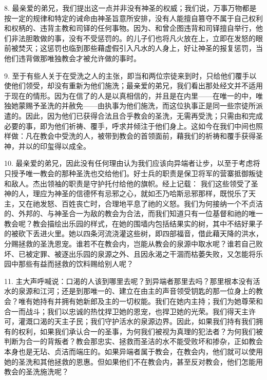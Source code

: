 8. 最亲爱的弟兄，我们提出这一点并非没有神圣的权威；我们说，万事万物都是按一定的规律和特定的诫命由神圣旨意所安排，没有人能擅自篡夺不属于自己权利和权柄的、违背主教和司铎的任何事物。因为、和曾企图违背和司铎擅自举行，他们非法胆敢做的事，没有不受惩罚的。的儿子们也将凡火放在上，立即在发怒的眼前被焚灭；这惩罚也临到那些藉虚假引入凡水的人身上，好让神圣的报复惩罚，当他们违背做那唯独教会才被允许做的事时。\par

9. 至于有些人关于在受洗之人的主张，即当和两位宗徒来到时，只给他们覆手以使他们领受，却没有重新为他们施洗；最亲爱的弟兄，我们看出那处经文并不适用于现在的情形。因为在信了的人是以真相信的，并且是在内里——在唯一的中，唯独她蒙赐予圣洗的并赦免——由执事为他们施洗，而这位执事正是同一些宗徒所派遣的。因此，因为他们已获得合法且合乎教会的圣洗，无需再受洗；只需由和完成必要的事，即为他们祈祷、覆手，呼求并倾注于他们身上。这如今在我们中间也照样做：凡在教会中受洗的人，被带到教会的首领面前，藉我们的祈祷和覆手获得圣神，并以的印玺得以成全。\par

10. 最亲爱的弟兄，因此没有任何理由认为我们应该向异端者让步，以至于考虑将只授予唯一教会的那种圣洗也交给他们。好士兵的职责是保卫将军的营寨抵御叛徒和敌人。杰出领袖的职责是守护托付给他的旗帜。经上记载： 我们这些领受了圣神的人，理应为神圣的信德怀有忌邪之心，就如丕乃哈斯忌邪那样，既悦乐了天主，又在祂发怒、百姓丧亡时，合理地平息了祂的义怒。我们为何接纳一个不贞洁的、外邦的、与神圣合一为敌的教会为合法，而我们知道只有一位基督和祂的唯一教会呢？教会描绘出乐园的样式，在她的围墙内包括结果实的树，其中不结好果子的被砍下丢进火里。她以四条河流浇灌这些树，即四部福音，借此藉天降的洪水，分赐拯救的圣洗恩宠。谁若不在教会内，岂能从教会的泉源中取水呢？谁若自己败坏、已被定罪、被逐出乐园的泉源之外、且因永渴之干涸而枯萎失败，又怎能将乐园中那些有益而拯救的饮料赐给别人呢？\par

11. 主大声呼喊说：口渴的人该到哪里去呢？到异端者那里去吗？那里根本没有活水的泉源和江河；还是到那唯一的、建立在由主的声音领受钥匙的那一位身上的教会？唯有她持有并拥有她新郎及主的一切权能。我们在她内主持；我们为她尊荣和合一而战斗；我们以忠诚的热忱捍卫她的恩宠，也捍卫她的光荣。我们得天主许可，灌溉口渴的天主子民；我们守护活水的泉源边界。因此，如果我们持有我们拥有的权利，如果我们承认合一的圣事，为何我们被视为真理的犯法者？为何我们被判断为合一的背叛者？教会那忠实、拯救而圣洁的水不能受败坏和掺杂，正如教会本身也是无玷、贞洁而端庄的。如果异端者属于教会，在教会内，他们就可以使用她的圣洗和其他拯救的恩惠。但如果他们不在教会内，甚至反对教会，他们怎能用教会的圣洗施洗呢？\par

